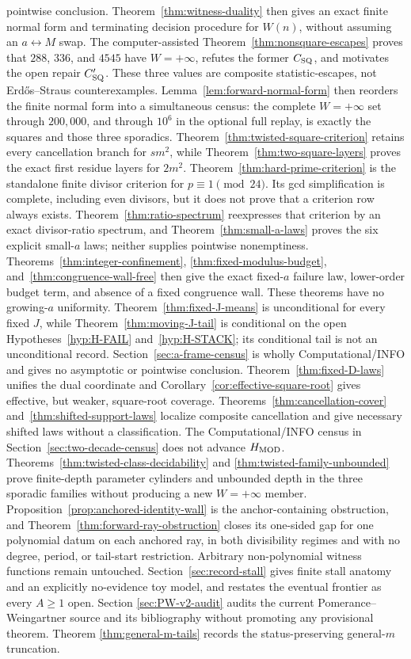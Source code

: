 \documentclass[10pt,reqno]{amsart}
\theoremstyle{definition}
\newcommand{\1}{\mathbf 1}
\begin{document}
pointwise conclusion.  Theorem~\ref{thm:witness-duality} then gives an exact
finite normal form and terminating decision procedure for $W(n)$, without
assuming an $a\leftrightarrow M$ swap.  The computer-assisted
Theorem~\ref{thm:nonsquare-escapes} proves that $288$, $336$, and $4545$
have $W=+\infty$, refutes the former $C_{\rm SQ}$, and motivates the open
repair $C_{\rm SQ}'$.  These three values are composite statistic-escapes,
not Erd\H{o}s--Straus counterexamples.  Lemma~\ref{lem:forward-normal-form}
then reorders the finite normal form into a simultaneous census: the
complete $W=+\infty$ set through $200{,}000$, and through $10^6$ in the
optional full replay, is exactly the squares and those three sporadics.
Theorem~\ref{thm:twisted-square-criterion} retains every cancellation branch
for $sm^2$, while Theorem~\ref{thm:two-square-layers} proves the exact first
residue layers for $2m^2$.  Theorem~\ref{thm:hard-prime-criterion} is the
standalone finite divisor criterion for $p\equiv1\pmod {24}$.  Its gcd
simplification is complete, including even divisors, but it does not prove
that a criterion row always exists.  Theorem~\ref{thm:ratio-spectrum}
reexpresses that criterion by an exact divisor-ratio spectrum, and
Theorem~\ref{thm:small-a-laws} proves the six explicit small-$a$ laws;
neither supplies pointwise nonemptiness.  Theorems~\ref{thm:integer-confinement},
\ref{thm:fixed-modulus-budget}, and~\ref{thm:congruence-wall-free} then give
the exact fixed-$a$ failure law, lower-order budget term, and absence of a
fixed congruence wall.  These theorems have no growing-$a$ uniformity.
Theorem~\ref{thm:fixed-J-means} is unconditional for every fixed $J$, while
Theorem~\ref{thm:moving-J-tail} is conditional on the open
Hypotheses~\ref{hyp:H-FAIL} and~\ref{hyp:H-STACK}; its conditional tail is
not an unconditional record.  Section~\ref{sec:a-frame-census} is wholly
Computational/INFO and gives no asymptotic or pointwise conclusion.
Theorem~\ref{thm:fixed-D-laws} unifies the dual coordinate and
Corollary~\ref{cor:effective-square-root} gives effective, but weaker,
square-root coverage.  Theorems~\ref{thm:cancellation-cover}
and~\ref{thm:shifted-support-laws} localize composite cancellation and give
necessary shifted laws without a classification.  The Computational/INFO
census in Section~\ref{sec:two-decade-census} does not advance
$H_{\rm MOD}$.  Theorems~\ref{thm:twisted-class-decidability} and
\ref{thm:twisted-family-unbounded} prove finite-depth parameter cylinders and
unbounded depth in the three sporadic families without producing a new
$W=+\infty$ member.  Proposition~\ref{prop:anchored-identity-wall} is the
anchor-containing obstruction, and
Theorem~\ref{thm:forward-ray-obstruction} closes its one-sided gap for one
polynomial datum on each anchored ray, in both divisibility regimes and with
no degree, period, or tail-start restriction.  Arbitrary non-polynomial
witness functions remain untouched.  Section~\ref{sec:record-stall} gives
finite stall anatomy and an explicitly no-evidence toy model, and restates
the eventual frontier as every $A\geq1$ open.  Section
\ref{sec:PW-v2-audit} audits the current Pomerance--Weingartner source and its
bibliography without promoting any provisional theorem.  Theorem
\ref{thm:general-m-tails} records the status-preserving general-$m$
truncation.
\end{document}
